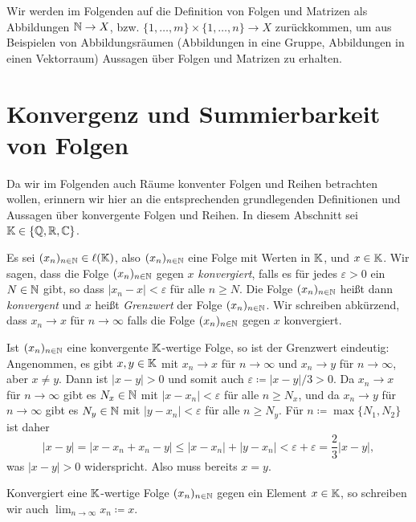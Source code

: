 \begin{bem}
 Wir werden im Folgenden auf die Definition von Folgen und Matrizen als Abbildungen $\mathbb{N} \to X$, bzw. $\{1, \dotsc, m\} \times \{1, \dotsc, n\} \to X$ zurückkommen, um aus Beispielen von Abbildungsräumen (Abbildungen in eine Gruppe, Abbildungen in einen Vektorraum) Aussagen über Folgen und Matrizen zu erhalten.
\end{bem}





\section{Konvergenz und Summierbarkeit von Folgen}\label{sec: sequences and series}
Da wir im Folgenden auch Räume konventer Folgen und Reihen betrachten wollen, erinnern wir hier an die entsprechenden grundlegenden Definitionen und Aussagen über konvergente Folgen und Reihen. In diesem Abschnitt sei $\mathbb{K} \in \{\mathbb{Q}, \mathbb{R}, \mathbb{C}\}$.


\begin{defi}
 Es sei $(x_n)_{n \in \mathbb{N}} \in \ell(\mathbb{K})$, also $(x_n)_{n \in \mathbb{N}}$ eine Folge mit Werten in $\mathbb{K}$, und $x \in \mathbb{K}$. Wir sagen, dass die Folge $(x_n)_{n \in \mathbb{N}}$ gegen $x$ \emph{konvergiert}, falls es für jedes $\varepsilon > 0$ ein $N \in \mathbb{N}$ gibt, so dass $|x_n - x| < \varepsilon$ für alle $n \geq N$. Die Folge $(x_n)_{n \in \mathbb{N}}$ heißt dann \emph{konvergent} und $x$ heißt \emph{Grenzwert} der Folge $(x_n)_{n \in \mathbb{N}}$. Wir schreiben abkürzend, dass $x_n \to x$ für $n \to \infty$ falls die Folge $(x_n)_{n \in \mathbb{N}}$ gegen $x$ konvergiert.
\end{defi}


\begin{bem}
 Ist $(x_n)_{n \in \mathbb{N}}$ eine konvergente $\mathbb{K}$-wertige Folge, so ist der Grenzwert eindeutig: Angenommen, es gibt $x,y \in \mathbb{K}$ mit $x_n \to x$ für $n \to \infty$ und $x_n \to y$ für $n \to \infty$, aber $x \neq y$. Dann ist $|x-y| > 0$ und somit auch $\varepsilon \coloneqq |x-y|/3 > 0$. Da $x_n \to x$ für $n \to \infty$ gibt es $N_x \in \mathbb{N}$ mit $|x-x_n| < \varepsilon$ für alle $n \geq N_x$, und da $x_n \to y$ für $n \to \infty$ gibt es $N_y \in \mathbb{N}$ mit $|y-x_n| < \varepsilon$ für alle $n \geq N_y$. Für $n \coloneqq \max \{N_1, N_2\}$ ist daher
 \[
  |x-y|
  = |x-x_n+x_n-y|
  \leq |x - x_n| + |y - x_n|
  < \varepsilon + \varepsilon
  = \frac{2}{3}|x-y|,
 \]
 was $|x-y| > 0$ widerspricht. Also muss bereits $x = y$.
 
 Konvergiert eine $\mathbb{K}$-wertige Folge $(x_n)_{n \in \mathbb{N}}$ gegen ein Element $x \in \mathbb{K}$, so schreiben wir auch $\lim_{n \to \infty} x_n \coloneqq x$.
\end{bem}


